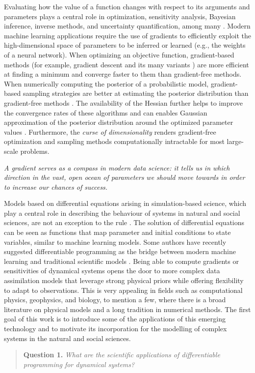 Evaluating how the value of a function changes with respect to its arguments and parameters plays a central role in optimization, sensitivity analysis, Bayesian inference, inverse methods, and uncertainty quantification, among many \cite{Razavi.2021}. 
Modern machine learning applications require the use of gradients to efficiently exploit the high-dimensional space of parameters to be inferred or learned (e.g., the weights of a neural network). 
When optimizing an objective function, gradient-based methods (for example, gradient descent and its many variants \cite{ruder2016overview-gradient-descent}) are more efficient at finding a minimum and converge faster to them than gradient-free methods.
When numerically computing the posterior of a probabilistic model, gradient-based sampling strategies are better at estimating the posterior distribution than gradient-free methods \cite{neal2011mcmc}. 
The availability of the Hessian further helps to improve the convergence rates of these algorithms and can enables Gaussian approximation of the posterior distribution around the optimized parameter values \cite{BuiThanh:2012ul}.
Furthermore, the \textit{curse of dimensionality} renders gradient-free optimization and sampling methods computationally intractable for most large-scale problems.
\begin{displayquote}
\emph{A gradient serves as a compass in modern data science: it tells us in which direction in the vast, open ocean of parameters we should move towards in order to increase our chances of success.  }
\end{displayquote}

Models based on differential equations arising in simulation-based science, which play a central role in describing the behaviour of systems in natural and social sciences, are not an exception to the rule \cite{Ghattas.2021}.
The solution of differential equations can be seen as functions that map parameter and initial conditions to state variables, similar to machine learning models.
Some authors have recently suggested differentiable programming as the bridge between modern machine learning and traditional scientific models \cite{Ramsundar_Krishnamurthy_Viswanathan_2021, Shen_diff_modelling, Gelbrecht-differential-programming-Earth, rackauckas2021generalized}. 
Being able to compute gradients or sensitivities of dynamical systems opens the door to more complex data assimilation models that leverage strong physical priors while offering flexibility to adapt to observations.
This is very appealing in fields such as computational physics, geophysics, and biology, to mention a few, where there is a broad literature on physical models and a long tradition in numerical methods. 
The first goal of this work is to introduce some of the applications of this emerging technology and to motivate its incorporation for the modelling of complex systems in the natural and social sciences. 
\begin{quote}
    \textbf{Question 1. }
    \textit{What are the scientific applications of differentiable programming for dynamical systems?}
\end{quote}

